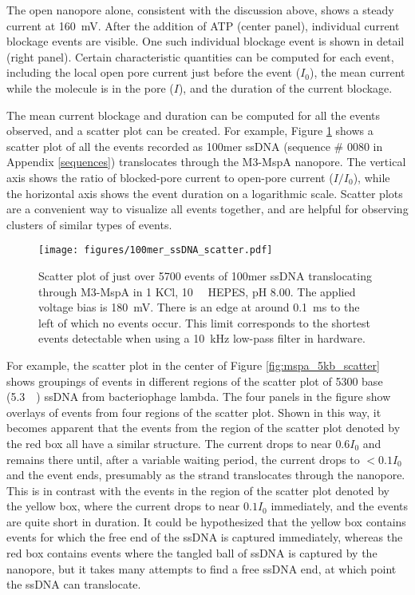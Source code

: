 The open nanopore alone, consistent with the discussion above, shows a steady current at \SI{160}{\mV}.  After the addition of ATP (center panel), individual current blockage events are visible.  One such individual blockage event is shown in detail (right panel).  Certain characteristic quantities can be computed for each event, including the local open pore current just before the event ($I_0$), the mean current while the molecule is in the pore ($I$), and the duration of the current blockage.

The mean current blockage and duration can be computed for all the events observed, and a scatter plot can be created.  For example, Figure \ref{fig:mspa_100mer_scatter} shows a scatter plot of all the events recorded as \num{100}mer ssDNA (sequence \# 0080 in Appendix \ref{sequences}) translocates through the M3-MspA nanopore.  The vertical axis shows the ratio of blocked-pore current to open-pore current ($I/I_0$), while the horizontal axis shows the event duration on a logarithmic scale.  Scatter plots are a convenient way to visualize all events together, and are helpful for observing clusters of similar types of events.

\begin{figure}[h]
\begin{centering}
\texttt{[image: figures/100mer\_ssDNA\_scatter.pdf]}
\caption[Scatter plot of 100mer ssDNA in MspA]{Scatter plot of just over 5700 events of 100mer ssDNA translocating through M3-MspA in \SI{1}{\Molar} KCl, \SI{10}{\milli\Molar} HEPES, pH \num{8.00}.  The applied voltage bias is \SI{180}{\mV}.  There is an edge at around \SI{0.1}{ms} to the left of which no events occur.  This limit corresponds to the shortest events detectable when using a \SI{10}{\kHz} low-pass filter in hardware.}
\label{fig:mspa_100mer_scatter}
\end{centering}
\end{figure}

For example, the scatter plot in the center of Figure \ref{fig:mspa_5kb_scatter} shows groupings of events in different regions of the scatter plot of \num{5300} base (\SI{5.3}{\kilo\base}) ssDNA from bacteriophage lambda.  The four panels in the figure show overlays of events from four regions of the scatter plot.  Shown in this way, it becomes apparent that the events from the region of the scatter plot denoted by the red box all have a similar structure.  The current drops to near $0.6 I_0$ and remains there until, after a variable waiting period, the current drops to $<0.1 I_0$ and the event ends, presumably as the strand translocates through the nanopore.  This is in contrast with the events in the region of the scatter plot denoted by the yellow box, where the current drops to near $0.1 I_0$ immediately, and the events are quite short in duration.  It could be hypothesized that the yellow box contains events for which the free end of the ssDNA is captured immediately, whereas the red box contains events where the tangled ball of ssDNA is captured by the nanopore, but it takes many attempts to find a free ssDNA end, at which point the ssDNA can translocate.

